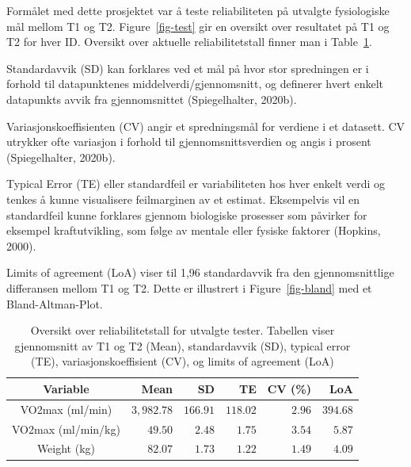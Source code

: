 \documentclass[
  letterpaper,
  DIV=11,
  numbers=noendperiod]{scrartcl}
\begin{document}
Formålet med dette prosjektet var å teste reliabiliteten på utvalgte
fysiologiske mål mellom T1 og T2. Figure~\ref{fig-test} gir en oversikt
over resultatet på T1 og T2 for hver ID. Oversikt over aktuelle
reliabilitetstall finner man i Table~\ref{tbl-rel}.

Standardavvik (SD) kan forklares ved et mål på hvor stor spredningen er
i forhold til datapunktenes middelverdi/gjennomsnitt, og definerer hvert
enkelt datapunkts avvik fra gjennomsnittet (Spiegelhalter, 2020b).

Variasjonskoeffisienten (CV) angir et spredningsmål for verdiene i et
datasett. CV utrykker ofte variasjon i forhold til gjennomsnittsverdien
og angis i prosent (Spiegelhalter, 2020b).

Typical Error (TE) eller standardfeil er variabiliteten hos hver enkelt
verdi og tenkes å kunne visualisere feilmarginen av et estimat.
Eksempelvis vil en standardfeil kunne forklares gjennom biologiske
prosesser som påvirker for eksempel kraftutvikling, som følge av mentale
eller fysiske faktorer (Hopkins, 2000).

Limits of agreement (LoA) viser til 1,96 standardavvik fra den
gjennomsnittlige differansen mellom T1 og T2. Dette er illustrert i
Figure~\ref{fig-bland} med et Bland-Altman-Plot.

\hypertarget{tbl-rel}{}
\begin{longtable}{crrrrr}
\caption{\label{tbl-rel}Oversikt over reliabilitetstall for utvalgte tester. Tabellen viser
gjennomsnitt av T1 og T2 (Mean), standardavvik (SD), typical error (TE),
variasjonskoeffisient (CV), og limits of agreement (LoA) }\tabularnewline

\toprule
Variable & Mean & SD & TE & CV (\%) & LoA \\ 
\midrule\addlinespace[2.5pt]
VO2max (ml/min) & $3,982.78$ & $166.91$ & $118.02$ & $2.96$ & $394.68$ \\ 
VO2max (ml/min/kg) & $49.50$ & $2.48$ & $1.75$ & $3.54$ & $5.87$ \\ 
Weight (kg) & $82.07$ & $1.73$ & $1.22$ & $1.49$ & $4.09$ \\ 
\bottomrule
\end{longtable}
\end{document}
